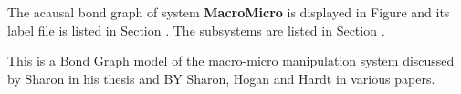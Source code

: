 

   The acausal bond graph of system \textbf{MacroMicro} is
   displayed in Figure  and its label
   file is listed in Section .
   The subsystems are listed in Section .

This is a Bond Graph model of the macro-micro manipulation system
discussed by Sharon in his thesis and BY Sharon, Hogan and Hardt in
various papers.
